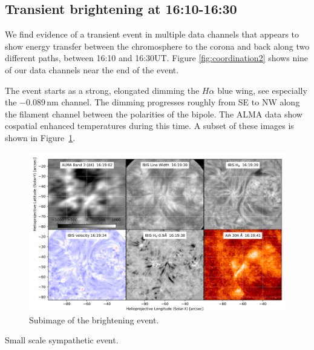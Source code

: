 \documentclass[twocolumn]{aastex62}
\newcommand{\unit}[1]{\ensuremath{\, \mathrm{#1}}}
\newcommand{\figref}[1]{Figure \ref{#1}}
\newcommand{\halpha}{\ensuremath{H\alpha}}
\begin{document}
\subsection{Transient brightening at 16:10-16:30}
We find evidence of a transient event in multiple data channels that appears to show energy transfer between the chromosphere to the corona and back along two different paths, between 16:10 and 16:30UT.
\figref{fig:coordination2} shows nine of our data channels near the end of the event.

The event starts as a strong, elongated dimming the \halpha{} blue wing, see especially the $-0.089\unit{nm}$ channel.
The dimming progresses roughly from SE to NW along the filament channel between the polarities of the bipole.
The ALMA data show cospatial enhanced temperatures during this time. A subset of these images is shown in Figure~\ref{fig:subset}.
\begin{figure}
    \centering
    \includegraphics[width=\linewidth]{figures/IBISsubset_img0106.png}
    \caption{Subimage of the brightening event.}
    \label{fig:subset}
\end{figure}

Small scale sympathetic event.
\end{document}
